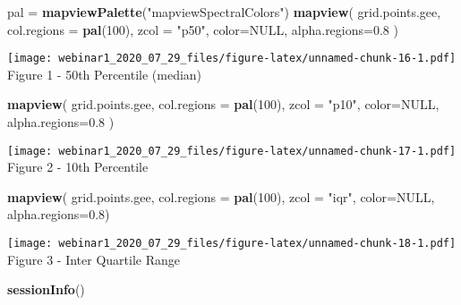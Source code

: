 \documentclass[]{article}
\newenvironment{Shaded}{\begin{snugshade}}{\end{snugshade}}
\newcommand{\DataTypeTok}[1]{\textcolor[rgb]{0.13,0.29,0.53}{#1}}
\newcommand{\DecValTok}[1]{\textcolor[rgb]{0.00,0.00,0.81}{#1}}
\newcommand{\FloatTok}[1]{\textcolor[rgb]{0.00,0.00,0.81}{#1}}
\newcommand{\KeywordTok}[1]{\textcolor[rgb]{0.13,0.29,0.53}{\textbf{#1}}}
\newcommand{\NormalTok}[1]{#1}
\newcommand{\OtherTok}[1]{\textcolor[rgb]{0.56,0.35,0.01}{#1}}
\newcommand{\StringTok}[1]{\textcolor[rgb]{0.31,0.60,0.02}{#1}}
\begin{document}
\begin{Shaded}
\begin{Highlighting}[]
\NormalTok{pal =}\StringTok{ }\KeywordTok{mapviewPalette}\NormalTok{(}\StringTok{"mapviewSpectralColors"}\NormalTok{)}
\KeywordTok{mapview}\NormalTok{( grid.points.gee, }\DataTypeTok{col.regions =} \KeywordTok{pal}\NormalTok{(}\DecValTok{100}\NormalTok{), }\DataTypeTok{zcol =} \StringTok{"p50"}\NormalTok{, }
         \DataTypeTok{color=}\OtherTok{NULL}\NormalTok{, }\DataTypeTok{alpha.regions=}\FloatTok{0.8}\NormalTok{  ) }
\end{Highlighting}
\end{Shaded}

\texttt{[image: webinar1\_2020\_07\_29\_files/figure-latex/unnamed-chunk-16-1.pdf]}
Figure 1 - 50th Percentile (median)

\newpage

\begin{Shaded}
\begin{Highlighting}[]
\KeywordTok{mapview}\NormalTok{( grid.points.gee, }\DataTypeTok{col.regions =} \KeywordTok{pal}\NormalTok{(}\DecValTok{100}\NormalTok{), }\DataTypeTok{zcol =} \StringTok{"p10"}\NormalTok{, }
         \DataTypeTok{color=}\OtherTok{NULL}\NormalTok{, }\DataTypeTok{alpha.regions=}\FloatTok{0.8}\NormalTok{  ) }
\end{Highlighting}
\end{Shaded}

\texttt{[image: webinar1\_2020\_07\_29\_files/figure-latex/unnamed-chunk-17-1.pdf]}
Figure 2 - 10th Percentile

\newpage

\begin{Shaded}
\begin{Highlighting}[]
\KeywordTok{mapview}\NormalTok{( grid.points.gee, }\DataTypeTok{col.regions =} \KeywordTok{pal}\NormalTok{(}\DecValTok{100}\NormalTok{), }\DataTypeTok{zcol =} \StringTok{"iqr"}\NormalTok{, }
         \DataTypeTok{color=}\OtherTok{NULL}\NormalTok{, }\DataTypeTok{alpha.regions=}\FloatTok{0.8}\NormalTok{)}
\end{Highlighting}
\end{Shaded}

\texttt{[image: webinar1\_2020\_07\_29\_files/figure-latex/unnamed-chunk-18-1.pdf]}
Figure 3 - Inter Quartile Range

\begin{Shaded}
\begin{Highlighting}[]
\KeywordTok{sessionInfo}\NormalTok{()}
\end{Highlighting}
\end{Shaded}
\end{document}
